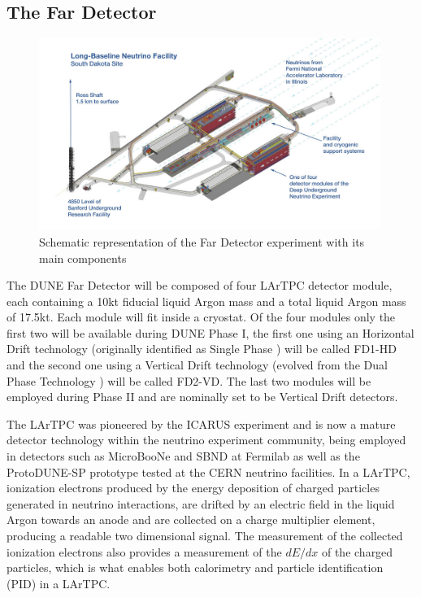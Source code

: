 \subsection{The Far Detector}
\begin{figure}[!ht]
     \centering
     \includegraphics[width=0.99\textwidth]{figures/ch3-DUNE/Far_Detector.jpg}
     \caption{Schematic representation of the Far Detector experiment with its main components}
        \label{fig:FarDetectorHall}
\end{figure}
The DUNE Far Detector will be composed of four LArTPC detector module, each containing a 10kt fiducial liquid Argon mass  and a total liquid Argon mass of 17.5kt. Each module will fit inside a cryostat. Of the four modules only the first two will be available during DUNE Phase I, the first one using an Horizontal Drift technology (originally identified as Single Phase \cite{DUNE:2020TDR4}) will be called FD1-HD and the second one using a Vertical Drift technology\cite{DUNE:2023TDRVD} (evolved from the Dual Phase Technology \cite{DUNE:2018mlo}) will be called FD2-VD. The last two modules will be employed during Phase II and are nominally set to be Vertical Drift detectors\cite{DUNE:2022Snowmass}.

The LArTPC was pioneered by the ICARUS experiment \cite{Rubbia:1977zz,ICARUS:2004wqc} and is now a mature detector technology within the neutrino experiment community, being employed in detectors such as MicroBooNe\cite{MicroBooNE:2016pwy} and SBND\cite{Machado:2019oxb} at Fermilab as well as the ProtoDUNE-SP\cite{DUNE:2020cqd} prototype tested at the CERN neutrino facilities. In a LArTPC, ionization electrons produced by the energy deposition of charged particles generated in neutrino interactions, are drifted by an electric field in the liquid Argon towards an anode and are collected on a charge multiplier element, producing a readable two dimensional signal. The measurement of the collected ionization electrons also provides a measurement of the $dE/dx$ of the charged particles, which is what enables both calorimetry and particle identification (PID) in a LArTPC.

